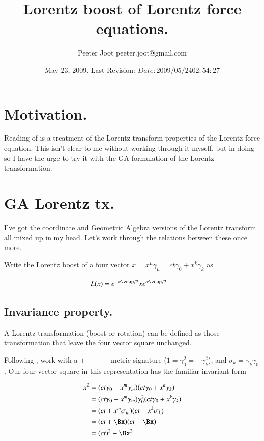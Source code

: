 \documentclass{article}
\title{ Lorentz boost of Lorentz force equations. }
\author{Peeter Joot \quad peeter.joot@gmail.com }
\date{ May 23, 2009.  Last Revision: $Date: 2009/05/24 02:54:27 $ }
\begin{document}
\maketitle{}
\tableofcontents
\section{ Motivation. }

Reading of \cite{bohm1996str} is a treatment of the Lorentz transform
properties of the Lorentz force equation.  This isn't clear to me
without working through it myself, but in doing so I have the urge to
try it with the GA formulation of the Lorentz transformation.

\section{ GA Lorentz tx. }

I've got the coordinate and Geometric Algebra versions of the Lorentz
transform all mixed up in my head.  Let's work through the relations 
between these once more.

Write the Lorentz boost of a four vector $x = x^\mu \gamma_\mu = ct \gamma_0 + x^k \gamma_k$ as

\begin{align}\label{eqn:LorentzBoost}
L(x) &= 
e^{-\alpha \vcap/2}
x
e^{\alpha \vcap/2}
\end{align}

\subsection{ Invariance property. }

A Lorentz transformation (boost or rotation) can be defined as those transformation that leave the four vector square unchanged.

Following \cite{doran2003gap}, work with a $+---$ metric signature ($1 = \gamma_0^2 = -\gamma_k^2$), and $\sigma_k = \gamma_k \gamma_0$.  Our four vector square in this representation has the familiar invariant form

\begin{align*}
x^2 
&= (ct \gamma_0 + x^m \gamma_m) (ct \gamma_0 + x^k \gamma_k) \\
&= (ct \gamma_0 + x^m \gamma_m) \gamma_0^2 (ct \gamma_0 + x^k \gamma_k) \\
&= (ct + x^m \sigma_m) (ct - x^k \sigma_k) \\
&= (ct + \Bx) (ct - \Bx) \\
&= (ct)^2 - \Bx^2
\end{align*}
\end{document}

